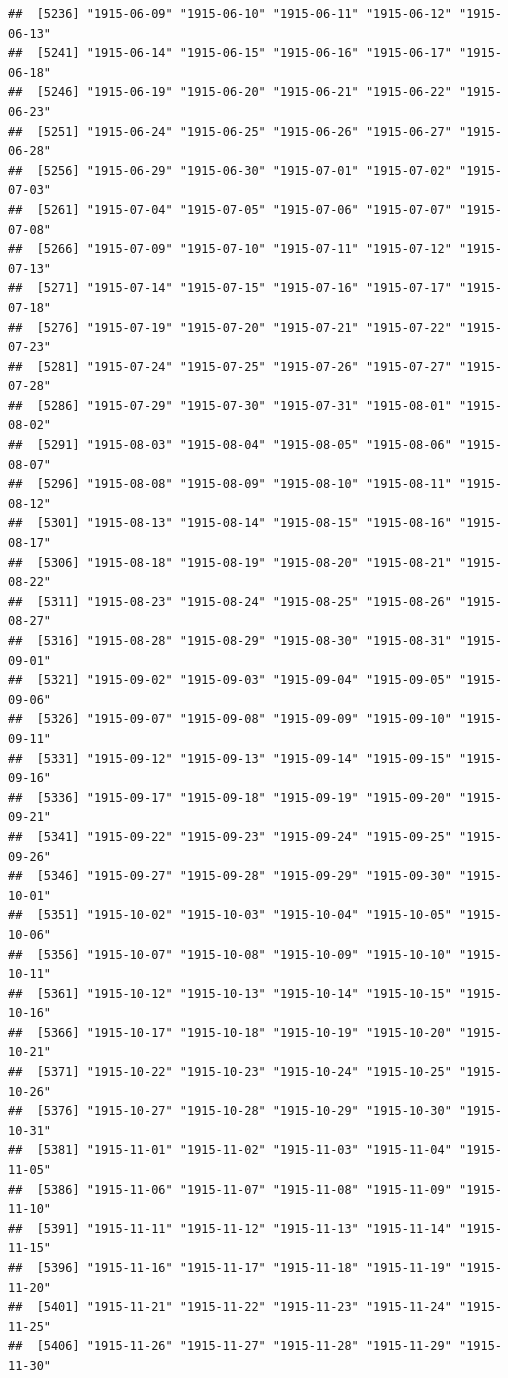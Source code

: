 \documentclass{article}\usepackage[]{graphicx}\usepackage[]{color}
\makeatletter
\newenvironment{kframe}{%
 \def\at@end@of@kframe{}%
 \ifinner\ifhmode%
  \def\at@end@of@kframe{\end{minipage}}%
  \begin{minipage}{\columnwidth}%
 \fi\fi%
 \def\FrameCommand##1{\hskip\@totalleftmargin \hskip-\fboxsep
 \colorbox{shadecolor}{##1}\hskip-\fboxsep
     \hskip-\linewidth \hskip-\@totalleftmargin \hskip\columnwidth}%
 \MakeFramed {\advance\hsize-\width
   \@totalleftmargin\z@ \linewidth\hsize
   \@setminipage}}%
 {\par\unskip\endMakeFramed%
 \at@end@of@kframe}
\newenvironment{knitrout}{}{} %
\makeatother
\begin{document}
\begin{description}
\begin{knitrout}
\begin{kframe}
\begin{verbatim}
##  [5236] "1915-06-09" "1915-06-10" "1915-06-11" "1915-06-12" "1915-06-13"
##  [5241] "1915-06-14" "1915-06-15" "1915-06-16" "1915-06-17" "1915-06-18"
##  [5246] "1915-06-19" "1915-06-20" "1915-06-21" "1915-06-22" "1915-06-23"
##  [5251] "1915-06-24" "1915-06-25" "1915-06-26" "1915-06-27" "1915-06-28"
##  [5256] "1915-06-29" "1915-06-30" "1915-07-01" "1915-07-02" "1915-07-03"
##  [5261] "1915-07-04" "1915-07-05" "1915-07-06" "1915-07-07" "1915-07-08"
##  [5266] "1915-07-09" "1915-07-10" "1915-07-11" "1915-07-12" "1915-07-13"
##  [5271] "1915-07-14" "1915-07-15" "1915-07-16" "1915-07-17" "1915-07-18"
##  [5276] "1915-07-19" "1915-07-20" "1915-07-21" "1915-07-22" "1915-07-23"
##  [5281] "1915-07-24" "1915-07-25" "1915-07-26" "1915-07-27" "1915-07-28"
##  [5286] "1915-07-29" "1915-07-30" "1915-07-31" "1915-08-01" "1915-08-02"
##  [5291] "1915-08-03" "1915-08-04" "1915-08-05" "1915-08-06" "1915-08-07"
##  [5296] "1915-08-08" "1915-08-09" "1915-08-10" "1915-08-11" "1915-08-12"
##  [5301] "1915-08-13" "1915-08-14" "1915-08-15" "1915-08-16" "1915-08-17"
##  [5306] "1915-08-18" "1915-08-19" "1915-08-20" "1915-08-21" "1915-08-22"
##  [5311] "1915-08-23" "1915-08-24" "1915-08-25" "1915-08-26" "1915-08-27"
##  [5316] "1915-08-28" "1915-08-29" "1915-08-30" "1915-08-31" "1915-09-01"
##  [5321] "1915-09-02" "1915-09-03" "1915-09-04" "1915-09-05" "1915-09-06"
##  [5326] "1915-09-07" "1915-09-08" "1915-09-09" "1915-09-10" "1915-09-11"
##  [5331] "1915-09-12" "1915-09-13" "1915-09-14" "1915-09-15" "1915-09-16"
##  [5336] "1915-09-17" "1915-09-18" "1915-09-19" "1915-09-20" "1915-09-21"
##  [5341] "1915-09-22" "1915-09-23" "1915-09-24" "1915-09-25" "1915-09-26"
##  [5346] "1915-09-27" "1915-09-28" "1915-09-29" "1915-09-30" "1915-10-01"
##  [5351] "1915-10-02" "1915-10-03" "1915-10-04" "1915-10-05" "1915-10-06"
##  [5356] "1915-10-07" "1915-10-08" "1915-10-09" "1915-10-10" "1915-10-11"
##  [5361] "1915-10-12" "1915-10-13" "1915-10-14" "1915-10-15" "1915-10-16"
##  [5366] "1915-10-17" "1915-10-18" "1915-10-19" "1915-10-20" "1915-10-21"
##  [5371] "1915-10-22" "1915-10-23" "1915-10-24" "1915-10-25" "1915-10-26"
##  [5376] "1915-10-27" "1915-10-28" "1915-10-29" "1915-10-30" "1915-10-31"
##  [5381] "1915-11-01" "1915-11-02" "1915-11-03" "1915-11-04" "1915-11-05"
##  [5386] "1915-11-06" "1915-11-07" "1915-11-08" "1915-11-09" "1915-11-10"
##  [5391] "1915-11-11" "1915-11-12" "1915-11-13" "1915-11-14" "1915-11-15"
##  [5396] "1915-11-16" "1915-11-17" "1915-11-18" "1915-11-19" "1915-11-20"
##  [5401] "1915-11-21" "1915-11-22" "1915-11-23" "1915-11-24" "1915-11-25"
##  [5406] "1915-11-26" "1915-11-27" "1915-11-28" "1915-11-29" "1915-11-30"

\end{verbatim}
\end{kframe}
\end{knitrout}
\end{description}
\end{document}
